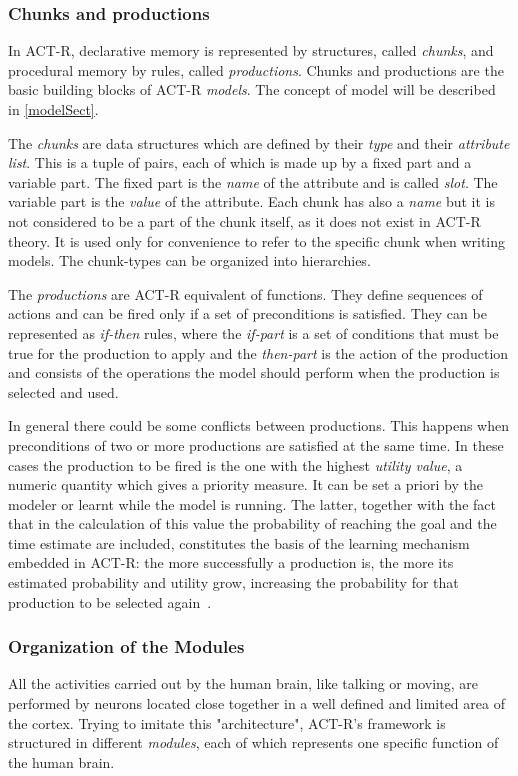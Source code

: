 		\subsubsection{Chunks and productions}
		In \mbox{ACT-R}, declarative memory is represented by structures, called \emph{chunks}, and procedural memory  by rules, called \emph{productions}. Chunks and productions are the basic building blocks of ACT-R \emph{models}. The concept of model will be described in \ref{modelSect}.
	
		The \emph{chunks} are data structures which are defined by their \emph{type} and their \emph{attribute list}. This is a tuple of pairs, each of which is made up by a fixed part and a variable part.
		The fixed part is the \emph{name} of the attribute and is called \emph{slot}.
		The variable part is the \emph{value} of the attribute.
		Each chunk has also a \emph{name} but it is not considered to be a part of the chunk itself, as it does not exist in \mbox{ACT-R} theory. It is used only for convenience to refer to the specific chunk when writing models. The chunk-types can be organized into hierarchies.
	
		The \emph{productions} are \mbox{ACT-R} equivalent of functions. They define sequences of actions and can be fired only if a set of preconditions is satisfied. They can be represented as \emph{if-then} rules, where the \emph{if-part} is a set of conditions that must be true for the production to apply and the \emph{then-part} is the action of the production and consists of the operations the model should perform when the production is selected and used. 

		In general there could be some conflicts between productions. This happens when preconditions of two or more productions are satisfied at the same time. In these cases the production to be fired is the one with the highest \emph{utility value}, a numeric quantity which gives a priority measure. It can be set a priori by the modeler or learnt while the model is running. The latter, together with the fact that in the calculation of this value the probability of reaching the goal and the time estimate are included, constitutes the basis of the learning mechanism embedded in \mbox{ACT-R}: the more successfully a production is, the more its estimated probability and utility grow, increasing the probability for that production to be selected again~\cite{actr6refman}.
	

		\subsubsection{Organization of the Modules}
		All the activities carried out by the human brain, like talking or moving, are performed by neurons located close together in a well defined and limited area of the cortex. Trying to imitate this "architecture", \mbox{ACT-R's} framework is structured in different \emph{modules}, each of which represents one specific function of the human brain. 
	

